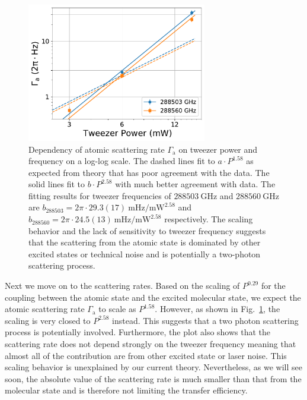 \begin{figure}
  \centering
  \includegraphics[width=0.7\textwidth]{figures/raman_transfer_scatter_scaling_atom.pdf}
  \caption[Atomic scattering rate as a function of tweezer power and frequency]{
    Dependency of atomic scattering rate $\Gamma_{\mathrm{a}}$
    on tweezer power and frequency on a log-log scale.
    The dashed lines fit to $a\cdot P^{1.58}$ as expected from theory
    that has poor agreement with the data.
    The solid lines fit to $b\cdot P^{2.58}$ with much better agreement with data.
    The fitting results for tweezer frequencies of
    $288503~\mathrm{GHz}$ and $288560~\mathrm{GHz}$ are
    $b_{288503}=2\pi\cdot29.3(17)~\mathrm{mHz/mW^{2.58}}$
    and $b_{288560}=2\pi\cdot24.5(13)~\mathrm{mHz/mW^{2.58}}$ respectively.
    The scaling behavior and the lack of sensitivity to tweezer frequency
    suggests that the scattering from the atomic state is dominated
    by other excited states or technical noise
    and is potentially a two-photon scattering process.
    \label{fig:raman-transfer:results:scaling:gamma-atom}}
\end{figure}

Next we move on to the scattering rates.
Based on the scaling of $P^{0.29}$ for the coupling
between the atomic state and the excited molecular state,
we expect the atomic scattering rate $\Gamma_{\mathrm{a}}$ to scale as $P^{1.58}$.
However, as shown in Fig.~\ref{fig:raman-transfer:results:scaling:gamma-atom},
the scaling is very closed to $P^{2.58}$ instead.
This suggests that a two photon scattering process is potentially involved.
Furthermore, the plot also shows that the scattering rate does not depend strongly
on the tweezer frequency meaning that almost all of the contribution
are from other excited state or laser noise.
This scaling behavior is unexplained by our current theory.
Nevertheless, as we will see soon, the absolute value of the scattering rate
is much smaller than that from the molecular state
and is therefore not limiting the transfer efficiency.

